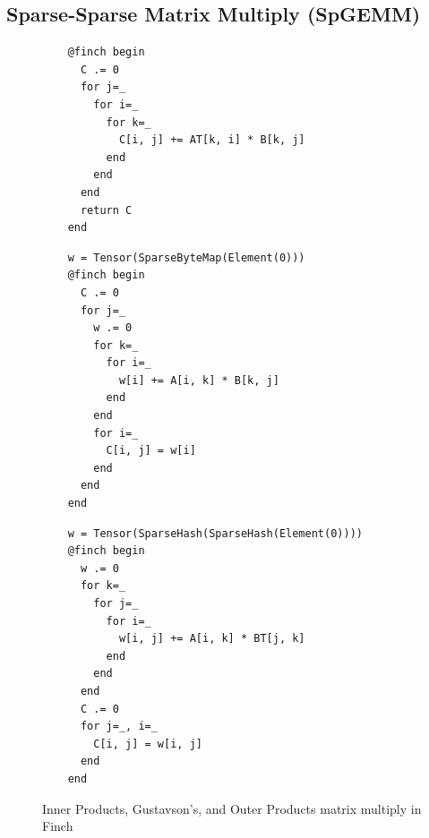 \subsection{Sparse-Sparse Matrix Multiply (SpGEMM)}

\begin{figure}[b]
    \begin{minipage}[t]{0.32\linewidth}
      \vspace{0pt}
    \begin{verbatim}
    @finch begin
      C .= 0
      for j=_
        for i=_
          for k=_
            C[i, j] += AT[k, i] * B[k, j]
          end
        end
      end
      return C
    end
    \end{verbatim}
    \end{minipage}%
    \begin{minipage}[t]{0.33\linewidth}
      \vspace{0pt}
    \begin{verbatim}
    w = Tensor(SparseByteMap(Element(0)))
    @finch begin
      C .= 0
      for j=_
        w .= 0
        for k=_
          for i=_
            w[i] += A[i, k] * B[k, j]
          end
        end
        for i=_
          C[i, j] = w[i]
        end
      end
    end
    \end{verbatim}
    \end{minipage}%
    \begin{minipage}[t]{0.35\linewidth}
      \vspace{0pt}
    \begin{verbatim}
    w = Tensor(SparseHash(SparseHash(Element(0))))
    @finch begin
      w .= 0
      for k=_
        for j=_
          for i=_
            w[i, j] += A[i, k] * BT[j, k]
          end
        end
      end
      C .= 0
      for j=_, i=_
        C[i, j] = w[i, j]
      end
    end
    \end{verbatim}
    \end{minipage}
    \caption{Inner Products, Gustavson's, and Outer Products matrix multiply in Finch}\label{fig:spgemm_listing}
\end{figure}


